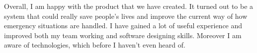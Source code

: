 \documentclass[]{article}
\begin{document}
Overall, I am happy with the product that we have created. It turned out to be a system that could really save people’s lives and improve the current way of how emergency situations are handled. I have gained a lot of useful experience and improved both my team working and software designing skills. Moreover I am aware of technologies, which before I haven’t even heard of.
\end{document}
